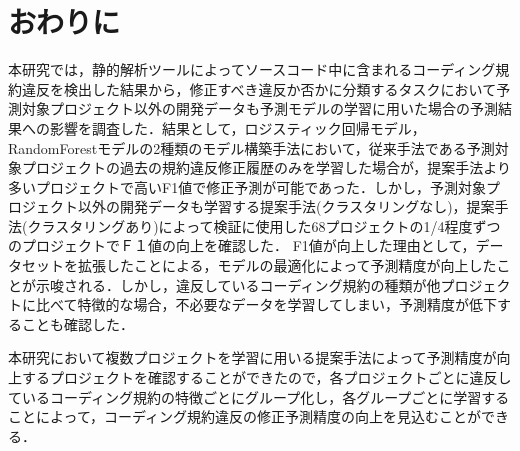 \documentclass[submit,noauthor,ses,dvipdfmx]{ipsj}
\begin{document}
\section{おわりに}\label{chap:end}

本研究では，静的解析ツールによってソースコード中に含まれるコーディング規約違反を検出した結果から，修正すべき違反か否かに分類するタスクにおいて予測対象プロジェクト以外の開発データも予測モデルの学習に用いた場合の予測結果への影響を調査した．結果として，ロジスティック回帰モデル，RandomForestモデルの2種類のモデル構築手法において，従来手法である予測対象プロジェクトの過去の規約違反修正履歴のみを学習した場合が，提案手法より多いプロジェクトで高いF1値で修正予測が可能であった．しかし，予測対象プロジェクト以外の開発データも学習する提案手法(クラスタリングなし)，提案手法(クラスタリングあり)によって検証に使用した68プロジェクトの1/4程度ずつのプロジェクトでＦ１値の向上を確認した．
F1値が向上した理由として，データセットを拡張したことによる，モデルの最適化によって予測精度が向上したことが示唆される．しかし，違反しているコーディング規約の種類が他プロジェクトに比べて特徴的な場合，不必要なデータを学習してしまい，予測精度が低下することも確認した．

本研究において複数プロジェクトを学習に用いる提案手法によって予測精度が向上するプロジェクトを確認することができたので，各プロジェクトごとに違反しているコーディング規約の特徴ごとにグループ化し，各グループごとに学習することによって，コーディング規約違反の修正予測精度の向上を見込むことができる．



\end{document}
